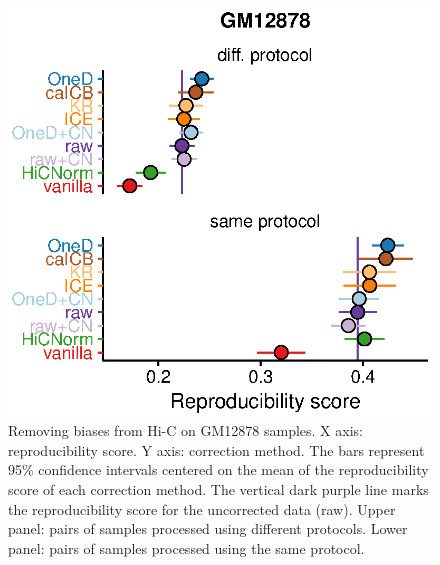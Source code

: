 \documentclass[12pt]{report}
\begin{document}
\begin{figure}
	\centerline{\includegraphics[width=\textwidth]{nar_figures/supp_figure_11.eps}}
    \caption{
    Removing biases from Hi-C on GM12878 samples. X axis: reproducibility
    score. Y axis: correction method. The bars represent 95\% confidence intervals centered on the mean of the
    reproducibility score of each correction method. The vertical dark purple
    line marks the reproducibility score for the uncorrected data (raw). Upper panel: pairs of
    samples processed using different protocols. Lower panel: pairs of samples
    processed using the same protocol.}
\end{figure}
\end{document}
